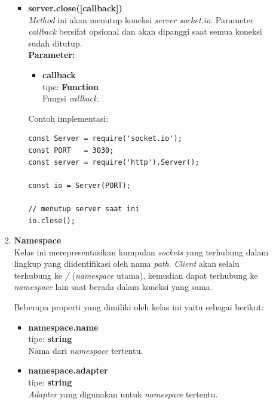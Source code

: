 \documentclass[a4paper,twoside]{article}
\begin{document}
\begin{enumerate}
\begin{enumerate}
\begin{enumerate}
\begin{itemize}
					\item \textbf{server.close([callback])} \\
					\textit{Method} ini akan menutup koneksi \textit{server socket.io}. Parameter \textit{callback} bersifat opsional dan akan dipanggi saat semua koneksi sudah ditutup. \\
					\textbf{Parameter:}
					\begin{itemize}
						\item \textbf{callback} \\tipe: \textbf{Function} \\ Fungsi \textit{callback}.
					\end{itemize}
					Contoh implementasi:
\begin{lstlisting}
const Server = require('socket.io');
const PORT   = 3030;
const server = require('http').Server();
					
const io = Server(PORT);
					
// menutup server saat ini
io.close(); 
\end{lstlisting}
					
					
				\end{itemize}
				
				\item \textbf{Namespace} \\ 
				Kelas ini merepresentasikan kumpulan \textit{sockets} yang terhubung dalam lingkup yang diidentifikasi oleh nama \textit{path}. \textit{Client} akan selalu terhubung ke \textit{/} (\textit{namespace} utama), kemudian dapat terhubung ke \textit{namespace} lain saat berada dalam koneksi yang sama.
				
				Beberapa properti yang dimiliki oleh kelas ini yaitu sebagai berikut:
				\begin{itemize}
					\item \textbf{namespace.name} \\tipe: \textbf{string} \\ Nama dari \textit{namespace} tertentu.
					\item \textbf{namespace.adapter} \\tipe: \textbf{string} \\ \textit{Adapter} yang digunakan untuk \textit{namespace} tertentu.
				\end{itemize}
				

\end{enumerate}
\end{enumerate}
\end{enumerate}
\end{document}
